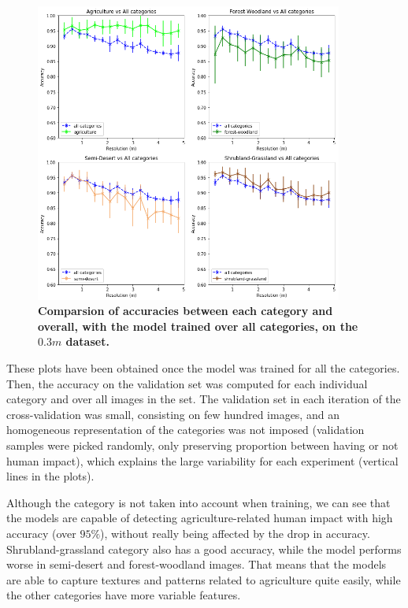 \begin{figure}[h!]
	\centering
	\includegraphics[width=0.9\textwidth]{Figures/results/acc_res_by_category_03m.png}
	\captionsetup{width=1\linewidth}
	\caption{\textbf{Comparsion of accuracies between each category and overall, with the model trained over all categories, on the $0.3m$ dataset.}}
	\label{fig:acc_by_cat_03m}
\end{figure}

These plots have been obtained once the model was trained for all the categories. Then, the accuracy on the validation set was computed for each individual category and over all images in the set. The validation set in each iteration of the cross-validation was small, consisting on few hundred images, and an homogeneous representation of the categories was not imposed (validation samples were picked randomly, only preserving proportion between having or not human impact), which explains the large variability for each experiment (vertical lines in the plots).

Although the category is not taken into account when training, we can see that the models are capable of detecting agriculture-related human impact with high accuracy (over $95\%$), without really being affected by the drop in accuracy. Shrubland-grassland category also has a good accuracy, while the model performs worse in semi-desert and forest-woodland images. That means that the models are able to capture textures and patterns related to agriculture quite easily, while the other categories have more variable features.

